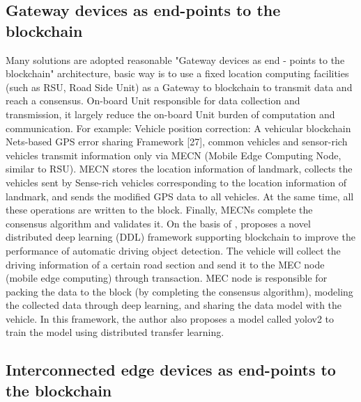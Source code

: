 \subsection{Gateway devices as end-points to the blockchain}

Many solutions are adopted reasonable "Gateway devices as end - points to the blockchain" architecture, basic way is to use a fixed location computing facilities (such as RSU, Road Side Unit) as a Gateway to blockchain to transmit data and reach a consensus. On-board Unit responsible for data collection and transmission, it largely reduce the on-board Unit burden of computation and communication. For example: Vehicle position correction: A vehicular blockchain Nets-based GPS error sharing Framework [27], common vehicles and sensor-rich vehicles transmit information only via MECN (Mobile Edge Computing Node, similar to RSU). MECN stores the location information of landmark, collects the vehicles sent by Sense-rich vehicles corresponding to the location information of landmark, and sends the modified GPS data to all vehicles. At the same time, all these operations are written to the block. Finally, MECNs complete the consensus algorithm and validates it.
On the basis of \cite{ref44}, \cite{ref42} proposes a novel distributed deep learning (DDL) framework supporting blockchain to improve the performance of automatic driving object detection. The vehicle will collect the driving information of a certain road section and send it to the MEC node (mobile edge computing) through transaction. MEC node is responsible for packing the data to the block (by completing the consensus algorithm), modeling the collected data through deep learning, and sharing the data model with the vehicle. In this framework, the author also proposes a model called yolov2 to train the model using distributed transfer learning.

\subsection{ Interconnected edge devices as end-points to the blockchain}


